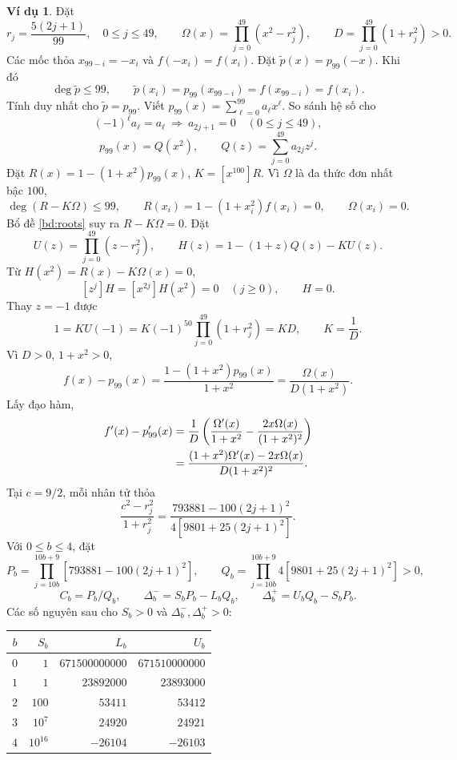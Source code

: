 \documentclass[12pt,a4paper,oneside]{book}
\numberwithin{algorithm}{chapter}
\theoremstyle{definition}
\newtheorem{vidu}{Ví dụ}[chapter]
\begin{document}
\begin{vidu}
Đặt
\[
 r_j=\frac{5(2j+1)}{99},\quad0\leq j\leq49,\qquad
 \Omega(x)=\prod_{j=0}^{49}(x^2-r_j^2),\qquad
 D=\prod_{j=0}^{49}(1+r_j^2)>0.
\]
Các mốc thỏa $x_{99-i}=-x_i$ và $f(-x_i)=f(x_i)$. Đặt
$\widetilde p(x)=p_{99}(-x)$. Khi đó
\[
 \deg\widetilde p\leq99,\qquad
 \widetilde p(x_i)=p_{99}(x_{99-i})=f(x_{99-i})=f(x_i).
\]
Tính duy nhất cho $\widetilde p=p_{99}$. Viết
$p_{99}(x)=\sum_{\ell=0}^{99}a_\ell x^\ell$. So sánh hệ số cho
\[
 (-1)^\ell a_\ell=a_\ell
 \ \Longrightarrow\ a_{2j+1}=0\quad(0\leq j\leq49),
\]
\[
 p_{99}(x)=Q(x^2),\qquad Q(z)=\sum_{j=0}^{49}a_{2j}z^j.
\]
Đặt $R(x)=1-(1+x^2)p_{99}(x)$, $K=[x^{100}]R$. Vì $\Omega$ là đa thức đơn nhất bậc $100$,
\[
 \deg(R-K\Omega)\leq99,\qquad
 R(x_i)=1-(1+x_i^2)f(x_i)=0,\qquad\Omega(x_i)=0.
\]
Bổ đề \ref{bd:roots} suy ra $R-K\Omega=0$. Đặt
\[
 U(z)=\prod_{j=0}^{49}(z-r_j^2),\qquad
 H(z)=1-(1+z)Q(z)-KU(z).
\]
Từ $H(x^2)=R(x)-K\Omega(x)=0$,
\[
 [z^j]H=[x^{2j}]H(x^2)=0\quad(j\geq0),\qquad H=0.
\]
Thay $z=-1$ được
\[
 1=KU(-1)=K(-1)^{50}\prod_{j=0}^{49}(1+r_j^2)=KD,
 \qquad K=\frac1D.
\]
Vì $D>0$, $1+x^2>0$,
\begin{equation}\label{eq:newton-100-exact-error}
 f(x)-p_{99}(x)
 =\frac{1-(1+x^2)p_{99}(x)}{1+x^2}
 =\frac{\Omega(x)}{D(1+x^2)}.
\end{equation}
Lấy đạo hàm,
\begin{align}
 f'(x)-p_{99}'(x)
 &=\frac1D\left(\frac{\Omega'(x)}{1+x^2}
       -\frac{2x\Omega(x)}{(1+x^2)^2}\right)\notag\\
 &=\frac{(1+x^2)\Omega'(x)-2x\Omega(x)}{D(1+x^2)^2}.
\label{eq:newton-100-deriv-error}
\end{align}
Tại $c=9/2$, mỗi nhân tử thỏa
\[
 \frac{c^2-r_j^2}{1+r_j^2}
 =\frac{793881-100(2j+1)^2}{4[9801+25(2j+1)^2]}.
\]
Với $0\leq b\leq4$, đặt
\[
 P_b=\prod_{j=10b}^{10b+9}[793881-100(2j+1)^2],\qquad
 Q_b=\prod_{j=10b}^{10b+9}4[9801+25(2j+1)^2]>0,
\]
\[
 C_b=P_b/Q_b,\qquad
 \Delta_b^-=S_bP_b-L_bQ_b,\qquad
 \Delta_b^+=U_bQ_b-S_bP_b.
\]
Các số nguyên sau cho $S_b>0$ và $\Delta_b^-,\Delta_b^+>0$:
\begin{center}
\small
\begin{tabular}{c|rrr}\toprule
$b$&$S_b$&$L_b$&$U_b$\\\midrule
$0$&$1$&$671500000000$&$671510000000$\\
$1$&$1$&$23892000$&$23893000$\\
$2$&$100$&$53411$&$53412$\\
$3$&$10^7$&$24920$&$24921$\\
$4$&$10^{16}$&$-26104$&$-26103$\\\bottomrule

\end{tabular}
\end{center}
\end{vidu}
\end{document}

